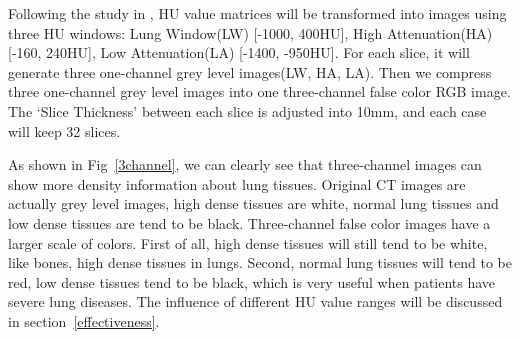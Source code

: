 \documentclass[journal]{IEEEtran}
\begin{document}
Following the study in \cite{Shin2017Three} \cite{gao2018holistic}, HU value matrices will be transformed into images using three HU windows: Lung Window(LW) [-1000, 400HU], High Attenuation(HA) [-160, 240HU], Low Attenuation(LA) [-1400, -950HU]. 
For each slice, it will generate three one-channel grey level images(LW, HA, LA). Then we compress three one-channel grey level images into one three-channel false color RGB image. The `Slice Thickness' between each slice is adjusted into 10mm, and each case will keep 32 slices.

As shown in Fig~\ref{3channel}, we can clearly see that three-channel images can show more density information about lung tissues. Original CT images are actually grey level images, high dense tissues are white, normal lung tissues and low dense tissues are tend to be black. 
Three-channel false color images have a larger scale of colors. First of all, high dense tissues will still tend to be white, like bones, high dense tissues in lungs. Second, normal lung tissues will tend to be red, low dense tissues tend to be black, which is very useful when patients have severe lung diseases.
The influence of different HU value ranges will be discussed in section~\ref{effectiveness}.
\end{document}
